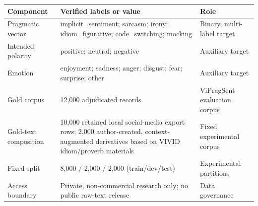 \begin{tabularx}{\textwidth}{@{}lXl@{}}
\toprule
Component & Verified labels or value & Role \\
\midrule
Pragmatic vector & implicit\_sentiment; sarcasm; irony; idiom\_figurative; code\_switching; mocking & Binary, multi-label target \\
Intended polarity & positive; neutral; negative & Auxiliary target \\
Emotion & enjoyment; sadness; anger; disgust; fear; surprise; other & Auxiliary target \\
Gold corpus & 12,000 adjudicated records & ViPragSent evaluation corpus \\
Gold-text composition & 10,000 retained local social-media export rows; 2,000 author-created, context-augmented derivatives based on VIVID idiom/proverb materials & Fixed experimental corpus \\
Fixed split & 8,000 / 2,000 / 2,000 (train/dev/test) & Experimental partitions \\
Access boundary & Private, non-commercial research only; no public raw-text release & Data governance \\
\bottomrule
\end{tabularx}
